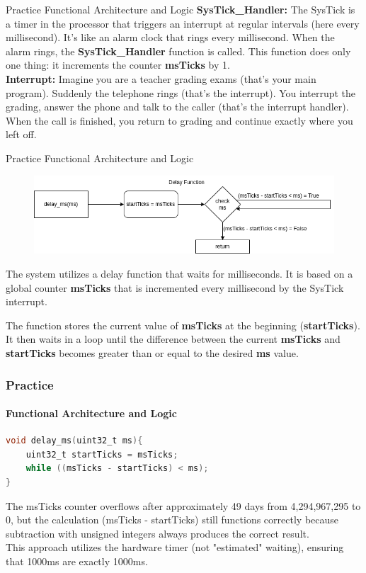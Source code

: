 \documentclass{beamer}
\begin{document}
\begin{frame}{Practice}
	{Functional Architecture and Logic}
	\textbf{SysTick\_Handler:} The SysTick is a timer in the processor that triggers an interrupt at regular intervals (here every millisecond). It's like an alarm clock that rings every millisecond. When the alarm rings, the \textbf{SysTick\_Handler} function is called. This function does only one thing: it increments the counter \textbf{msTicks} by 1.\\
	\vspace{0.2cm}
	\textbf{Interrupt:} Imagine you are a teacher grading exams (that's your main program). Suddenly the telephone rings (that's the interrupt). You interrupt the grading, answer the phone and talk to the caller (that's the interrupt handler). When the call is finished, you return to grading and continue exactly where you left off.
\end{frame}
\begin{frame}{Practice}
	{Functional Architecture and Logic}
	\begin{figure}
		\centering
		\includegraphics[width=\linewidth]{Blink_004.png}
	\end{figure}
	The system utilizes a delay function that waits for milliseconds. It is based on a global counter \textbf{msTicks} that is incremented every millisecond by the SysTick interrupt.
	
	The function stores the current value of \textbf{msTicks} at the beginning (\textbf{startTicks}). It then waits in a loop until the difference between the current \textbf{msTicks} and \textbf{startTicks} becomes greater than or equal to the desired \textbf{ms} value.
\end{frame}
\begin{frame}[fragile]
	\frametitle{Practice}
	\framesubtitle{Functional Architecture and Logic}
	\begin{lstlisting}[language=C]
void delay_ms(uint32_t ms){
	uint32_t startTicks = msTicks;
	while ((msTicks - startTicks) < ms);
}
	\end{lstlisting}
	The msTicks counter overflows after approximately 49 days from 4,294,967,295 to 0, but the calculation (msTicks - startTicks) still functions correctly because subtraction with unsigned integers always produces the correct result.\\
	\vspace{0.2cm}
	This approach utilizes the hardware timer (not "estimated" waiting), ensuring that 1000ms are exactly 1000ms.
\end{frame}
\end{document}
